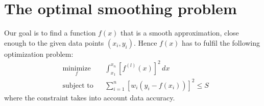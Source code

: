 \section{The optimal smoothing problem}
Our goal is to find a function $f(x)$ that is a smooth approximation, close enough to the given data points $(x_i,y_i)$. Hence $f(x)$ has to fulfil the following optimization problem:
\begin{equation*} 
\begin{aligned}
& \underset{f}{\text{minimize}}
& & \int_{x_1}^{x_n} [f^{(l)}(x)]^2 \,dx \\
& \text{subject to}
& & \sum\limits_{i=1}^{n}[w_i(y_i-f(x_i))]^2 \le S
\end{aligned}
\end{equation*}
where the constraint takes into account data accuracy.